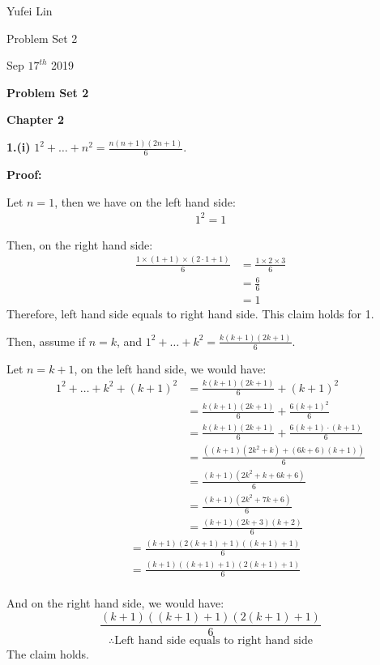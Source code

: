 \documentclass[a4paper,12pt]{report}
\begin{document}
\noindent
Yufei Lin

\noindent
Problem Set 2

\noindent
Sep \(17^{th}\) 2019

\begin{center}
\textbf{Problem Set 2}
\end{center}

\noindent
\textbf{Chapter 2}

\noindent
\textbf{1.(i)} $1^2+\dots+n^2=\frac{n(n+1)(2n+1)}{6}$.

\noindent
\textbf{Proof: }

\noindent
Let $n=1$, then we have on the left hand side:
\begin{align*}
1^2 = 1
\end{align*}

\noindent
Then, on the right hand side:
\begin{align*}
\frac{1\times (1+1)\times (2\cdot{1}+1)}{6} 
&= \frac{1\times 2\times 3}{6}\\
&=\frac{6}{6}\\
&=1
\end{align*}
\noindent
Therefore, left hand side equals to right hand side. This claim holds for 1.

\noindent
Then, assume if $n=k$, and $1^2+\dots+k^2=\frac{k(k+1)(2k+1)}{6}$.

Let $n=k+1$, on the left hand side, we would have:
\begin{align*}
1^2+\dots+k^2+(k+1)^2
&=\frac{k(k+1)(2k+1)}{6}+ (k+1)^2\\
&= \frac{k(k+1)(2k+1)}{6} + \frac{6(k+1)^2}{6}\\
&=\frac{k(k+1)(2k+1)}{6} + \frac{6(k+1)\cdot{(k+1)}}{6}\\
&=\frac{((k+1)(2k^2+k)+(6k+6)(k+1))}{6}\\
&=\frac{(k+1)(2k^2+k+6k+6)}{6}\\
&=\frac{(k+1)(2k^2+7k+6)}{6}\\
&=\frac{(k+1)(2k+3)(k+2)}{6}
\end{align*}
\begin{align*}
&=\frac{(k+1)(2(k+1)+1)((k+1)+1)}{6}\\
&=\frac{(k+1)((k+1)+1)(2(k+1)+1)}{6}\\
\end{align*}

\noindent
And on the right hand side, we would have:
\[\frac{(k+1)((k+1)+1)(2(k+1)+1)}{6}\]
\[\therefore \text{Left hand side equals to right hand side}\]
The claim holds. 
\end{document}
